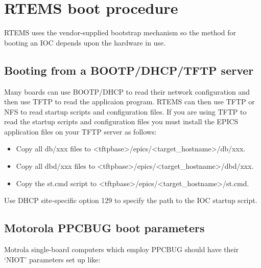 \section{RTEMS boot procedure}

RTEMS uses the vendor-supplied bootstrap mechanism so the method for booting an IOC depends upon the hardware in 
use.

\subsection{Booting from a BOOTP/DHCP/TFTP server}

Many boards can use BOOTP/DHCP to read their network configuration and then use TFTP to read the applicaion 
program.  RTEMS can then use TFTP or NFS to read startup scripts and configuration files. If you are using TFTP to read 
the startup scripts and configuration files you must install the EPICS application files on your TFTP server as follows:

\begin{itemize}\item Copy all db/xxx files to \textless{}tftpbase\textgreater{}/epics/\textless{}target\_hostname\textgreater{}/db/xxx.

\item Copy all dbd/xxx files to \textless{}tftpbase\textgreater{}/epics/\textless{}target\_hostname\textgreater{}/dbd/xxx.

\item Copy the st.cmd script  to \textless{}tftpbase\textgreater{}/epics/\textless{}target\_hostname\textgreater{}/st.cmd.

\end{itemize}Use DHCP site-specific option 129 to specify the path to the IOC startup script.

\subsection{Motorola PPCBUG boot parameters}

Motrola single-board computers which employ PPCBUG should have their `NIOT' parameters set up like:

